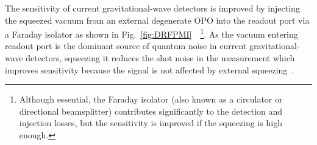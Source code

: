 The sensitivity of current gravitational-wave detectors is improved by injecting the squeezed vacuum from an external degenerate OPO into the readout port via a Faraday isolator as shown in Fig.~\ref{fig:DRFPMI}~\cite{aasietal2013}~\footnote{Although essential, the Faraday isolator (also known as a circulator or directional beamsplitter) contributes significantly to the detection and injection losses, but the sensitivity is improved if the squeezing is high enough.}.
As the vacuum entering readout port is the dominant source of quantum noise in current gravitational-wave detectors, squeezing it reduces the shot noise in the measurement which improves sensitivity because the signal is not affected by external squeezing~\cite{tseQuantumEnhancedAdvancedLIGO2019}.
